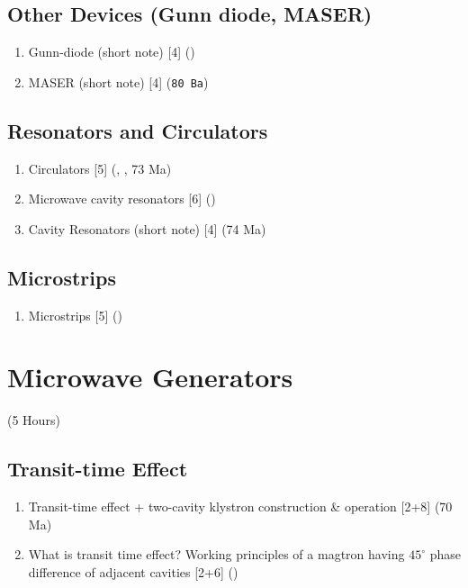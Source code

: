 \documentclass[12pt]{article}
\begin{document}
  \subsection{Other Devices (Gunn diode, MASER)}
    \begin{enumerate}[topsep=0pt, noitemsep]
      \item Gunn-diode (short note) \hfill [4] ()
      \item MASER (short note) \hfill [4] (\texttt{80 Ba})
    \end{enumerate}

  \subsection{Resonators and Circulators}
    \begin{enumerate}[topsep=0pt, noitemsep]
      \item Circulators \hfill [5] (, , 73 Ma)
      \item Microwave cavity resonators \hfill [6] ()
      \item Cavity Resonators (short note) \hfill [4] (74 Ma)
    \end{enumerate}

  \subsection{Microstrips}
    \begin{enumerate}[topsep=0pt, noitemsep]
      \item Microstrips \hfill [5] ()
    \end{enumerate}

\pagebreak
\section{Microwave Generators}
\begin{center}(5 Hours)\end{center}

  \subsection{Transit-time Effect}
    \begin{enumerate}[topsep=0pt, noitemsep]
      \item Transit-time effect + two-cavity klystron construction \& operation \hfill [2+8] (70 Ma)
      \item What is transit time effect? Working principles of a magtron having $45^\circ$ phase difference of adjacent cavities \hfill [2+6] ()
    \end{enumerate}
\end{document}
